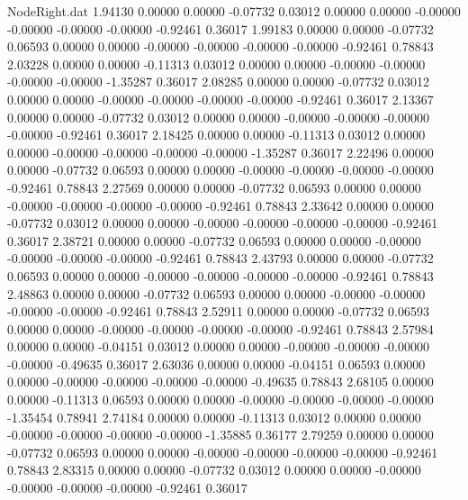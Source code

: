 \begin{filecontents}{NodeRight.dat}
   1.94130    0.00000    0.00000    -0.07732    0.03012    0.00000    0.00000   -0.00000   -0.00000   -0.00000   -0.00000   -0.92461    0.36017
   1.99183    0.00000    0.00000    -0.07732    0.06593    0.00000    0.00000   -0.00000   -0.00000   -0.00000   -0.00000   -0.92461    0.78843
   2.03228    0.00000    0.00000    -0.11313    0.03012    0.00000    0.00000   -0.00000   -0.00000   -0.00000   -0.00000   -1.35287    0.36017
   2.08285    0.00000    0.00000    -0.07732    0.03012    0.00000    0.00000   -0.00000   -0.00000   -0.00000   -0.00000   -0.92461    0.36017
   2.13367    0.00000    0.00000    -0.07732    0.03012    0.00000    0.00000   -0.00000   -0.00000   -0.00000   -0.00000   -0.92461    0.36017
   2.18425    0.00000    0.00000    -0.11313    0.03012    0.00000    0.00000   -0.00000   -0.00000   -0.00000   -0.00000   -1.35287    0.36017
   2.22496    0.00000    0.00000    -0.07732    0.06593    0.00000    0.00000   -0.00000   -0.00000   -0.00000   -0.00000   -0.92461    0.78843
   2.27569    0.00000    0.00000    -0.07732    0.06593    0.00000    0.00000   -0.00000   -0.00000   -0.00000   -0.00000   -0.92461    0.78843
   2.33642    0.00000    0.00000    -0.07732    0.03012    0.00000    0.00000   -0.00000   -0.00000   -0.00000   -0.00000   -0.92461    0.36017
   2.38721    0.00000    0.00000    -0.07732    0.06593    0.00000    0.00000   -0.00000   -0.00000   -0.00000   -0.00000   -0.92461    0.78843
   2.43793    0.00000    0.00000    -0.07732    0.06593    0.00000    0.00000   -0.00000   -0.00000   -0.00000   -0.00000   -0.92461    0.78843
   2.48863    0.00000    0.00000    -0.07732    0.06593    0.00000    0.00000   -0.00000   -0.00000   -0.00000   -0.00000   -0.92461    0.78843
   2.52911    0.00000    0.00000    -0.07732    0.06593    0.00000    0.00000   -0.00000   -0.00000   -0.00000   -0.00000   -0.92461    0.78843
   2.57984    0.00000    0.00000    -0.04151    0.03012    0.00000    0.00000   -0.00000   -0.00000   -0.00000   -0.00000   -0.49635    0.36017
   2.63036    0.00000    0.00000    -0.04151    0.06593    0.00000    0.00000   -0.00000   -0.00000   -0.00000   -0.00000   -0.49635    0.78843
   2.68105    0.00000    0.00000    -0.11313    0.06593    0.00000    0.00000   -0.00000   -0.00000   -0.00000   -0.00000   -1.35454    0.78941
   2.74184    0.00000    0.00000    -0.11313    0.03012    0.00000    0.00000   -0.00000   -0.00000   -0.00000   -0.00000   -1.35885    0.36177
   2.79259    0.00000    0.00000    -0.07732    0.06593    0.00000    0.00000   -0.00000   -0.00000   -0.00000   -0.00000   -0.92461    0.78843
   2.83315    0.00000    0.00000    -0.07732    0.03012    0.00000    0.00000   -0.00000   -0.00000   -0.00000   -0.00000   -0.92461    0.36017

\end{filecontents}

